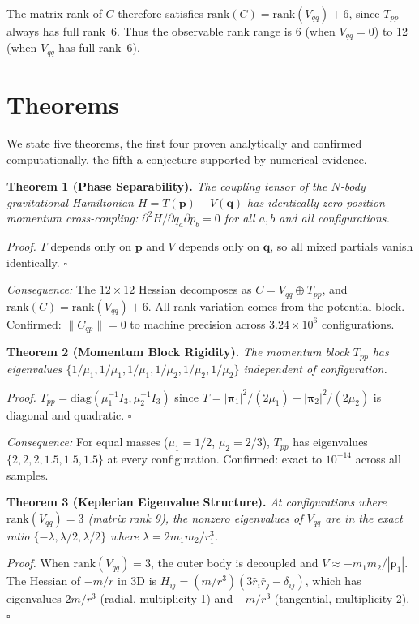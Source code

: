\documentclass[aps,pre,twocolumn,superscriptaddress,floatfix]{revtex4-2}
\begin{document}
The matrix rank of $C$ therefore satisfies
$\text{rank}(C) = \text{rank}(V_{qq}) + 6$,
since $T_{pp}$ always has full rank~6. Thus the observable rank range
is 6 (when $V_{qq} = 0$) to 12 (when $V_{qq}$ has full rank~6).

\section{Theorems}

We state five theorems, the first four proven analytically and confirmed
computationally, the fifth a conjecture supported by numerical evidence.

\medskip
\noindent\textbf{Theorem 1 (Phase Separability).}
\emph{The coupling tensor of the $N$-body gravitational Hamiltonian
$H = T(\mathbf{p}) + V(\mathbf{q})$ has identically zero
position-momentum cross-coupling:
$\partial^2 H / \partial q_a \partial p_b = 0$ for all $a, b$
and all configurations.}

\emph{Proof.} $T$ depends only on $\mathbf{p}$ and $V$ depends only
on $\mathbf{q}$, so all mixed partials vanish identically. $\square$

\emph{Consequence:} The $12 \times 12$ Hessian decomposes as
$C = V_{qq} \oplus T_{pp}$, and $\text{rank}(C) = \text{rank}(V_{qq}) + 6$.
All rank variation comes from the potential block.
Confirmed: $\|C_{qp}\| = 0$ to machine precision across
$3.24 \times 10^6$ configurations.

\medskip
\noindent\textbf{Theorem 2 (Momentum Block Rigidity).}
\emph{The momentum block $T_{pp}$ has eigenvalues
$\{1/\mu_1, 1/\mu_1, 1/\mu_1, 1/\mu_2, 1/\mu_2, 1/\mu_2\}$
independent of configuration.}

\emph{Proof.} $T_{pp} = \text{diag}(\mu_1^{-1} I_3, \mu_2^{-1} I_3)$
since $T = |\mathbf{\pi}_1|^2/(2\mu_1) + |\mathbf{\pi}_2|^2/(2\mu_2)$
is diagonal and quadratic. $\square$

\emph{Consequence:} For equal masses ($\mu_1 = 1/2$, $\mu_2 = 2/3$),
$T_{pp}$ has eigenvalues $\{2, 2, 2, 1.5, 1.5, 1.5\}$ at every
configuration. Confirmed: exact to $10^{-14}$ across all samples.

\medskip
\noindent\textbf{Theorem 3 (Keplerian Eigenvalue Structure).}
\emph{At configurations where $\text{rank}(V_{qq}) = 3$ (matrix
rank 9), the nonzero eigenvalues of $V_{qq}$ are in the exact
ratio $\{-\lambda, \lambda/2, \lambda/2\}$ where
$\lambda = 2 m_1 m_2 / r_1^3$.}

\emph{Proof.} When $\text{rank}(V_{qq}) = 3$, the outer body is
decoupled and $V \approx -m_1 m_2 / |\boldsymbol{\rho}_1|$. The
Hessian of $-m/r$ in 3D is
$H_{ij} = (m/r^3)(3\hat{r}_i \hat{r}_j - \delta_{ij})$,
which has eigenvalues $2m/r^3$ (radial, multiplicity 1)
and $-m/r^3$ (tangential, multiplicity 2). $\square$
\end{document}
